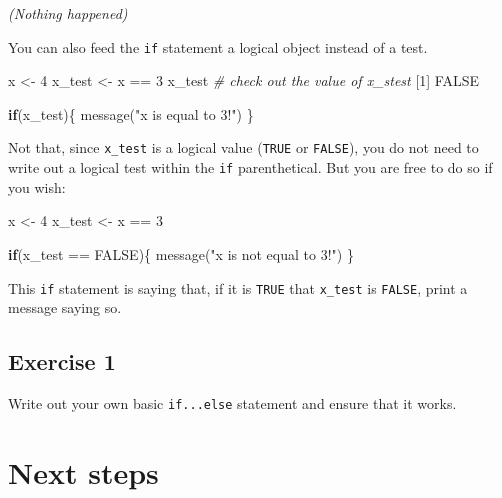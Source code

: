 \documentclass[
]{book}
\newenvironment{Shaded}{\begin{snugshade}}{\end{snugshade}}
\newcommand{\CommentTok}[1]{\textcolor[rgb]{0.56,0.35,0.01}{\textit{#1}}}
\newcommand{\ConstantTok}[1]{\textcolor[rgb]{0.00,0.00,0.00}{#1}}
\newcommand{\ControlFlowTok}[1]{\textcolor[rgb]{0.13,0.29,0.53}{\textbf{#1}}}
\newcommand{\DecValTok}[1]{\textcolor[rgb]{0.00,0.00,0.81}{#1}}
\newcommand{\FunctionTok}[1]{\textcolor[rgb]{0.00,0.00,0.00}{#1}}
\newcommand{\NormalTok}[1]{#1}
\newcommand{\OtherTok}[1]{\textcolor[rgb]{0.56,0.35,0.01}{#1}}
\newcommand{\SpecialCharTok}[1]{\textcolor[rgb]{0.00,0.00,0.00}{#1}}
\newcommand{\StringTok}[1]{\textcolor[rgb]{0.31,0.60,0.02}{#1}}
\begin{document}
\emph{(Nothing happened)}

You can also feed the \texttt{if} statement a logical object instead of a test.

\begin{Shaded}
\begin{Highlighting}[]
\NormalTok{x }\OtherTok{\textless{}{-}} \DecValTok{4}
\NormalTok{x\_test }\OtherTok{\textless{}{-}}\NormalTok{ x }\SpecialCharTok{==} \DecValTok{3}
\NormalTok{x\_test }\CommentTok{\# check out the value of x\_stest}
\NormalTok{[}\DecValTok{1}\NormalTok{] }\ConstantTok{FALSE}

\ControlFlowTok{if}\NormalTok{(x\_test)\{}
  \FunctionTok{message}\NormalTok{(}\StringTok{"x is equal to 3!"}\NormalTok{)}
\NormalTok{\}}
\end{Highlighting}
\end{Shaded}

Not that, since \texttt{x\_test} is a logical value (\texttt{TRUE} or \texttt{FALSE}), you do not need to write out a logical test within the \texttt{if} parenthetical. But you are free to do so if you wish:

\begin{Shaded}
\begin{Highlighting}[]
\NormalTok{x }\OtherTok{\textless{}{-}} \DecValTok{4}
\NormalTok{x\_test }\OtherTok{\textless{}{-}}\NormalTok{ x }\SpecialCharTok{==} \DecValTok{3}

\ControlFlowTok{if}\NormalTok{(x\_test }\SpecialCharTok{==} \ConstantTok{FALSE}\NormalTok{)\{}
  \FunctionTok{message}\NormalTok{(}\StringTok{"x is not equal to 3!"}\NormalTok{)}
\NormalTok{\}}
\end{Highlighting}
\end{Shaded}

This \texttt{if} statement is saying that, if it is \texttt{TRUE} that \texttt{x\_test} is \texttt{FALSE}, print a message saying so.

\hypertarget{exercise-1-7}{%
\subsection*{Exercise 1}\label{exercise-1-7}}

Write out your own basic \texttt{if...else} statement and ensure that it works.

\hypertarget{next-steps-1}{%
\section*{Next steps}\label{next-steps-1}}
\end{document}
